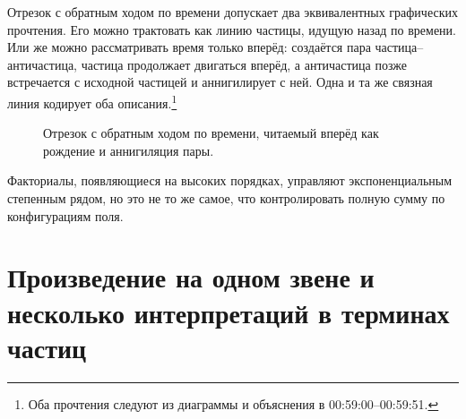Отрезок с обратным ходом по времени допускает два эквивалентных графических прочтения. Его можно трактовать как линию частицы, идущую назад по времени. Или же можно рассматривать время только вперёд: создаётся пара частица--античастица, частица продолжает двигаться вперёд, а античастица позже встречается с исходной частицей и аннигилирует с ней. Одна и та же связная линия кодирует оба описания.\footnote{Оба прочтения следуют из диаграммы и объяснения в 00:59:00--00:59:51.}

\begin{figure}[htbp]
\centering
{}
\caption{Отрезок с обратным ходом по времени, читаемый вперёд как рождение и аннигиляция пары.}
\end{figure}

Факториалы, появляющиеся на высоких порядках, управляют экспоненциальным степенным рядом, но это не то же самое, что контролировать полную сумму по конфигурациям поля.

\begin{classroomqa}
\end{classroomqa}

\section{Произведение на одном звене и несколько интерпретаций в терминах частиц}

